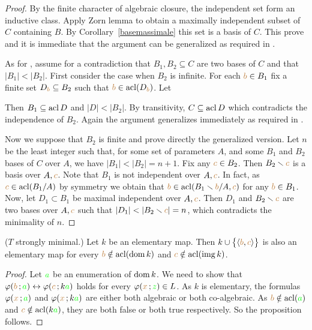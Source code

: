 \begin{proof}
By the finite character of algebraic closure, the independent set form an inductive class.
Apply Zorn lemma to obtain a maximally independent subset of $C$ containing $B$.
By Corollary~\ref{basemassimale} this set is a basis of $C$.
This prove  and it is immediate that the argument can be generalized as required in .

As for , assume for a contradiction that $B_1,B_2\subseteq C$ are two bases of $C$ and that $|B_1|<|B_2|$.
First consider the case when $B_2$ is infinite.
For each ${\color{brown} b}\in B_1$ fix a finite set $D_{\color{brown} b}\subseteq B_2$ such that ${\color{brown} b}\in\mathop{\rm acl}(D_{\color{brown} b})$.
Let


Then $B_1\subseteq\mathop{\rm acl} D$ and $|D|<|B_2|$.
By transitivity, $C\subseteq\mathop{\rm acl} D$ which contradicts the independence of $B_2$.
Again the argument generalizes immediately as required in .

Now we suppose that $B_2$ is finite and prove directly the generalized version.
Let $n$ be the least integer such that, for some set of parameters $A$, and some $B_1$ and $B_2$ bases of $C$ over $A$, we have $|B_1|<|B_2|=n+1$.
Fix any ${\color{brown} c}\in B_2$.
Then $B_2\smallsetminus{\color{brown}c}$ is a basis over $A,{\color{brown} c}$.
Note that $B_1$ is not independent over $A,{\color{brown} c}$.
In fact, as ${\color{brown} c}\in\mathop{\rm acl}(B_1/A)$ by symmetry we obtain that ${\color{brown} b}\in\mathop{\rm acl}(B_1\smallsetminus{\color{brown}b}/A,{\color{brown} c})$ for any ${\color{brown} b}\in B_1$.
Now, let $D_1\subset B_1$ be maximal independent over $A,{\color{brown} c}$.
Then $D_1$ and $B_2\smallsetminus{\color{brown}c}$ are two bases over $A,{\color{brown} c}$ such that $|D_1|<|B_2\sm{\mr c}|=n$, which contradicts the minimality of $n$.
\end{proof}

\begin{proposition}\label{prop_mappetraindipendenti} 
($T$ strongly minimal.) Let $k$ be an elementary map.
Then $k\cup\big\{\langle{\color{brown}b},{\color{brown} c}\rangle\big\}$ is also an elementary map for every ${\color{brown} b}\notin\mathop{\rm acl}(\mathop{\rm dom} k)$ and ${\color{brown} c}\notin\mathop{\rm acl}(\mathop{\rm img} k)$.
\end{proposition}
\begin{proof}
Let ${\color{green} a}$ be an enumeration of $\mathop{\rm dom} k$.
We need to show that $\varphi({\color{brown} b}\,;{\color{green} a})\leftrightarrow\varphi({\color{brown} c}\,;k{\color{green} a})$ holds for every $\varphi({\color{brown} x}\,;{\color{green} z})\in L$.
As $k$ is elementary, the formulas $\varphi({\color{brown} x}\,;{\color{green} a})$ and $\varphi({\color{brown} x}\,;k{\color{green} a})$ are either both algebraic or both co-algebraic.
As ${\color{brown} b}\notin\mathop{\rm acl}({\color{green} a})$ and ${\color{brown} c}\notin\mathop{\rm acl}(k{\color{green} a})$, they are both false or both true respectively.
So the proposition follows.
\end{proof}

